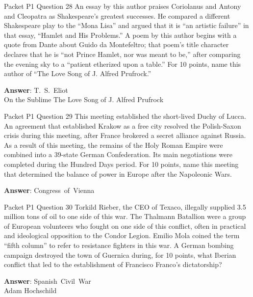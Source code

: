 \begin{frame}{Packet P1 Question 28}
An essay by this author praises Coriolanus   and Antony and Cleopatra as Shakespeare's greatest successes. He compared a different Shakespeare play to the ``Mona Lisa'' and argued that it is ``an artistic failure'' in that essay, ``Hamlet and His Problems.'' A poem by this author begins with a quote from Dante about Guido da Montefeltro; that poem's title character declares that he is ``not Prince Hamlet, nor was meant to be,'' after comparing the evening sky to a ``patient   etherized upon a table.'' For 10 points,     name this author of ``The Love Song   of J. Alfred Prufrock.''  

\textbf{Answer}: T.\ S.\ Eliot\\
 On the Sublime
 The Love Song of J. Alfred Prufrock
\end{frame}

\begin{frame}{Packet P1 Question 29}
This meeting established the short-lived Duchy of Lucca. An agreement     that established Krakow as a free city resolved the     Polish-Saxon crisis during this meeting, after France brokered a secret alliance against Russia. As a result of this meeting, the remains of the Holy Roman Empire were combined into a 39-state German Confederation. Its main negotiations were completed during the Hundred Days period. For 10 points, name this meeting that determined the balance of power in Europe after the Napoleonic Wars.

\textbf{Answer}: Congress\ of\ Vienna\\
\end{frame}

\begin{frame}{Packet P1 Question 30}
Torkild Rieber, the CEO   of Texaco, illegally supplied 3.5 million tons of oil to one side of this war. The Thalmann Batallion were a group of European volunteers who fought on one side of this conflict, often in practical and ideological opposition to the Condor Legion. Emilio Mola   coined the term ``fifth   column'' to refer   to resistance fighters in this war. A German bombing campaign destroyed the town of Guernica during,   for 10 points, what Iberian conflict that led to the establishment of Francisco Franco’s dictatorship?

\textbf{Answer}: Spanish\ Civil\ War\\
 Adam Hochschild
\end{frame}

